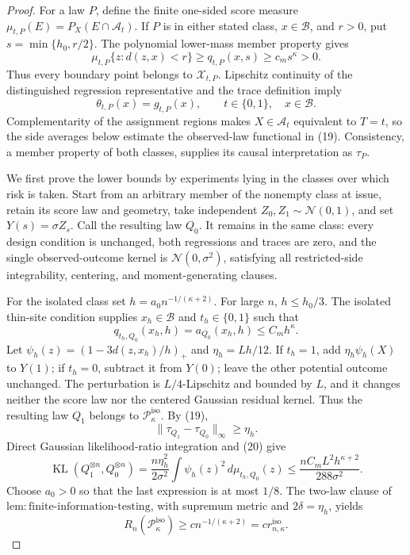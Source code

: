 \documentclass{article}
\begin{document}
\begin{proof}
For a law \(P\), define the finite one-sided score measure
\(\mu_{t,P}(E)=P_X(E\cap\mathcal A_t)\).  If \(P\) is in either stated
class, \(x\in\mathcal B\), and \(r>0\), put
\(s=\min\{h_0,r/2\}\).  The polynomial lower-mass member property gives
\[
 \mu_{t,P}\{z:d(z,x)<r\}\ge q_{t,P}(x,s)
 \ge c_ms^{\kappa}>0.
 \tag{18}
\]
Thus every boundary point belongs to \(\mathcal X_{t,P}\).  Lipschitz
continuity of the distinguished regression representative and the trace
definition imply
\[
 \theta_{t,P}(x)=g_{t,P}(x),
 \qquad t\in\{0,1\},\quad x\in\mathcal B.
 \tag{19}
\]
Complementarity of the assignment regions makes \(X\in\mathcal A_t\)
equivalent to \(T=t\), so the side averages below estimate the
observed-law functional in (19).  Consistency, a member property of both
classes, supplies its causal interpretation as \(\tau_P\).

We first prove the lower bounds by experiments lying in the classes over
which risk is taken.  Start from an arbitrary member of the nonempty class
at issue, retain its score law and geometry, take independent
\(Z_0,Z_1\sim\mathcal N(0,1)\), and set \(Y(s)=\sigma Z_s\).  Call the
resulting law \(Q_0\).  It remains in the same class: every design
condition is unchanged, both regressions and traces are zero, and the
single observed-outcome kernel is \(\mathcal N(0,\sigma^2)\), satisfying
all restricted-side integrability, centering, and moment-generating
clauses.

For the isolated class set \(h=a_0n^{-1/(\kappa+2)}\).  For large \(n\),
\(h\le h_0/3\).  The isolated thin-site condition supplies
\(x_h\in\mathcal B\) and \(t_h\in\{0,1\}\) such that
\[
 q_{t_h,Q_0}(x_h,h)=a_{Q_0}(x_h,h)\le C_mh^{\kappa}.
 \tag{20}
\]
Let \(\psi_h(z)=(1-3d(z,x_h)/h)_+\) and \(\eta_h=Lh/12\).  If
\(t_h=1\), add \(\eta_h\psi_h(X)\) to \(Y(1)\); if \(t_h=0\), subtract
it from \(Y(0)\); leave the other potential outcome unchanged.  The
perturbation is \(L/4\)-Lipschitz and bounded by \(L\), and it changes
neither the score law nor the centered Gaussian residual kernel.  Thus
the resulting law \(Q_1\) belongs to
\(\mathcal P_{\kappa}^{\mathrm{iso}}\).  By (19),
\[
 \|\tau_{Q_1}-\tau_{Q_0}\|_\infty\ge\eta_h.
 \tag{21}
\]
Direct Gaussian likelihood-ratio integration and (20) give
\[
 \operatorname{KL}(Q_1^{\otimes n},Q_0^{\otimes n})
 =\frac{n\eta_h^2}{2\sigma^2}
   \int\psi_h(z)^2\,d\mu_{t_h,Q_0}(z)
 \le\frac{nC_mL^2h^{\kappa+2}}{288\sigma^2}.
 \tag{22}
\]
Choose \(a_0>0\) so that the last expression is at most \(1/8\).  The
two-law clause of \(\mathrm{lem:finite\text{-}information\text{-}testing}\),
with supremum metric and \(2\delta=\eta_h\), yields
\[
 R_n(\mathcal P_{\kappa}^{\mathrm{iso}})
 \ge c n^{-1/(\kappa+2)}=c r_{n,\kappa}^{\mathrm{iso}}.
 \tag{23}
\]


\end{proof}
\end{document}
